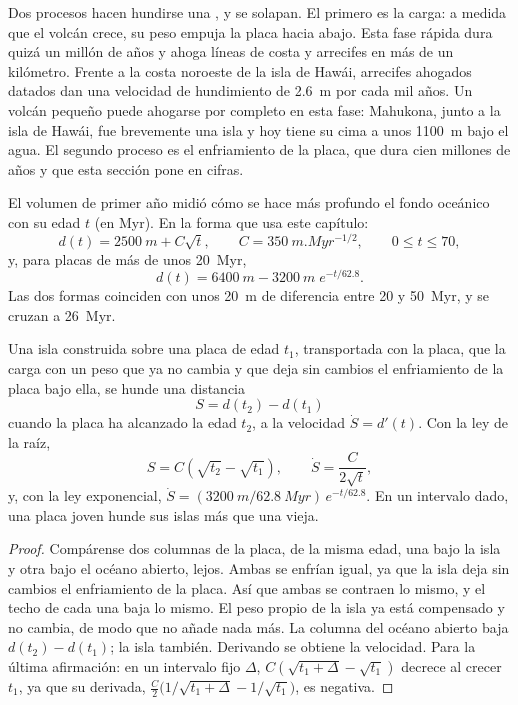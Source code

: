 Dos procesos hacen hundirse una , y se solapan. El primero es la carga: a medida que el volcán
crece, su peso empuja la placa hacia abajo. Esta fase rápida dura quizá un millón de años y
ahoga líneas de costa y arrecifes en más de un kilómetro. Frente a la costa noroeste de la isla de
Hawái, arrecifes ahogados datados dan una velocidad de hundimiento de \qty{2.6}{m} por cada mil años. Un volcán pequeño
puede ahogarse por completo en esta fase: Mahukona, junto a la isla de Hawái, fue brevemente una
isla y hoy tiene su cima a unos \qty{1100}{m} bajo el agua. El segundo proceso es el
enfriamiento de la placa, que dura cien millones de años y que esta sección pone en
cifras.

El volumen de primer año midió cómo se hace más profundo el fondo oceánico con su edad $t$ (en \unit{Myr}). En la
forma que usa este capítulo:
\[
d(t) = \qty{2500}{m} + C\sqrt{t}, \qquad C = \qty{350}{m.Myr^{-1/2}}, \qquad 0 \le t \le 70,
\]
y, para placas de más de unos \qty{20}{Myr},
\[
d(t) = \qty{6400}{m} - \qty{3200}{m}\; e^{-t/62.8}.
\]
Las dos formas coinciden con unos \qty{20}{m} de diferencia entre 20 y \qty{50}{Myr}, y se cruzan a
\qty{26}{Myr}.

\begin{proposition}\label{prop:b2:oceanic-islands:sinking}
Una isla construida sobre una placa de edad $t_1$, transportada con la placa, que la carga con un peso que
ya no cambia y que deja sin cambios el enfriamiento de la placa bajo ella, se hunde una distancia
\[
S = d(t_2) - d(t_1)
\]
cuando la placa ha alcanzado la edad $t_2$, a la velocidad $\dot S = d'(t)$. Con la ley de la raíz,
\[
S = C\left(\sqrt{t_2} - \sqrt{t_1}\right), \qquad \dot S = \frac{C}{2\sqrt t},
\]
y, con la ley exponencial, $\dot S = (\qty{3200}{m}/\qty{62.8}{Myr})\,e^{-t/62.8}$. En un
intervalo dado, una placa joven hunde sus islas más que una vieja.
\end{proposition}

\begin{proof}
Compárense dos columnas de la placa, de la misma edad, una bajo la isla y otra bajo el océano abierto,
lejos. Ambas se enfrían igual, ya que la isla deja sin cambios el enfriamiento de la placa. Así que ambas se contraen lo mismo, y el techo de cada una baja lo
mismo. El peso propio de la isla ya está compensado y no cambia, de modo que no añade nada
más. La columna del océano abierto baja $d(t_2) - d(t_1)$; la isla también. Derivando
se obtiene la velocidad. Para la última afirmación: en un intervalo fijo $\Delta$, $C(\sqrt{t_1 + \Delta} -
\sqrt{t_1})$ decrece al crecer $t_1$, ya que su derivada, $\frac C2\bigl(1/\sqrt{t_1 + \Delta}
- 1/\sqrt{t_1}\bigr)$, es negativa.
\end{proof}

